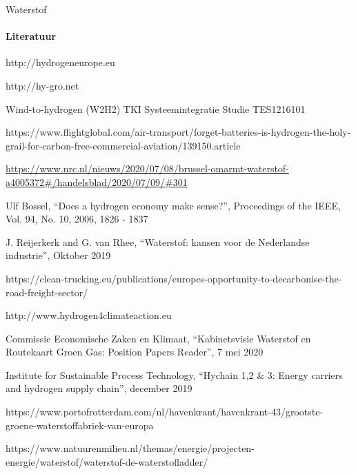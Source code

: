 \begin{voorstel}{Waterstof}
\begin{multicols*}{2}
\begin{aanbevelingen}
\end{aanbevelingen}

\paragraph{Literatuur}
http://hydrogeneurope.eu

http://hy-gro.net

Wind-to-hydrogen (W2H2) TKI Systeemintegratie Studie TES1216101

https://www.flightglobal.com/air-transport/forget-batteries-is-hydrogen-the-holy-grail-for-carbon-free-commercial-aviation/139150.article

\url{https://www.nrc.nl/nieuws/2020/07/08/brussel-omarmt-waterstof-a4005372#/handelsblad/2020/07/09/#301}

Ulf Bossel, “Does a hydrogen economy make sense?”, Proceedings of the IEEE, Vol. 94, No. 10, 2006, 1826 - 1837

J. Reijerkerk and G. van Rhee, “Waterstof: kansen voor de Nederlandse industrie”, Oktober 2019

https://clean-trucking.eu/publications/europes-opportunity-to-decarbonise-the-road-freight-sector/

http://www.hydrogen4climateaction.eu

Commissie Economische Zaken en Klimaat, “Kabinetsvisie Waterstof en Routekaart Groen Gas: Position Papers Reader”, 7 mei 2020

Institute for Sustainable Process Technology, “Hychain 1,2 \& 3: Energy carriers and hydrogen supply chain”, december 2019

https://www.portofrotterdam.com/nl/havenkrant/havenkrant-43/grootste-groene-waterstoffabriek-van-europa

https://www.natuurenmilieu.nl/themas/energie/projecten-energie/waterstof/waterstof-de-waterstofladder/

\end{multicols*}

\end{voorstel}
